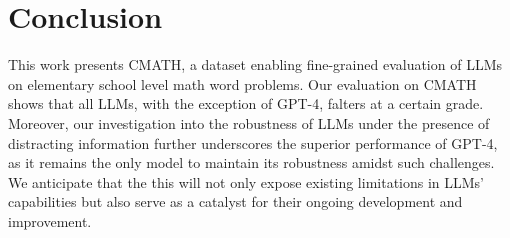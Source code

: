 \section{Conclusion}
This work presents CMATH, a dataset enabling fine-grained evaluation of LLMs on elementary school level math word problems. Our evaluation on CMATH shows that all LLMs, with the exception of GPT-4, falters at a certain grade. Moreover, our investigation into the robustness of LLMs under the presence of distracting information further underscores the superior performance of GPT-4, as it remains the only model to maintain its robustness amidst such challenges. We anticipate that the this will not only expose existing limitations in LLMs' capabilities but also serve as a catalyst for their ongoing development and improvement. 


